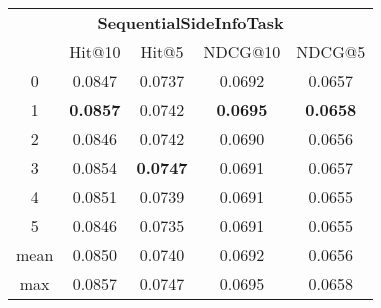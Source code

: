 \documentclass{article}
\begin{document}
 

\begin{tabular}{c|cccc}

\multicolumn{5}{c}{\textbf{SequentialSideInfoTask}} \\
\noalign{\smallskip}
\noalign{\smallskip}
\toprule
\multicolumn{1}{c}{Template ID} & \multicolumn{1}{|c}{Hit@10} & \multicolumn{1}{c}{Hit@5} & \multicolumn{1}{c}{NDCG@10} & \multicolumn{1}{c}{NDCG@5} \\
\midrule
0 & 0.0847 & 0.0737 & 0.0692 & 0.0657 \\
1 & \textbf{0.0857} & 0.0742 & \textbf{0.0695} & \textbf{0.0658} \\
2 & 0.0846 & 0.0742 & 0.0690 & 0.0656 \\
3 & 0.0854 & \textbf{0.0747} & 0.0691 & 0.0657 \\
4 & 0.0851 & 0.0739 & 0.0691 & 0.0655 \\
5 & 0.0846 & 0.0735 & 0.0691 & 0.0655 \\
\midrule
mean & 0.0850 & 0.0740 & 0.0692 & 0.0656 \\
max & 0.0857 & 0.0747 & 0.0695 & 0.0658 \\
\bottomrule

\end{tabular}
\end{document}
